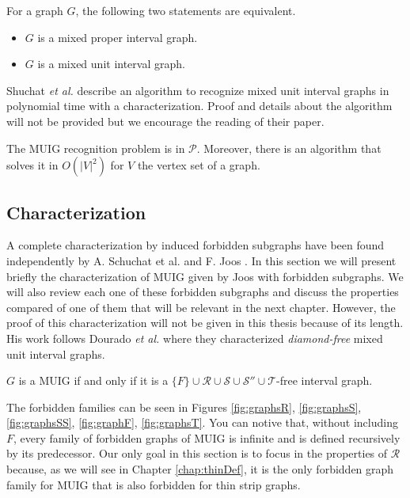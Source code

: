 \begin{theorem}
  For a graph $G$, the following two statements are equivalent.
  \begin{itemize}
    \item $G$ is a mixed proper interval graph.
    \item $G$ is a mixed unit interval graph.
  \end{itemize}
\end{theorem}

Shuchat \textit{et al.} \cite{shuchatUnitMixedInterval2014} describe an algorithm to recognize mixed unit interval graphs in polynomial time with a characterization. Proof and details about the algorithm will not be provided but we encourage the reading of their paper.

\begin{theorem}
 The MUIG recognition problem is in $\mathcal{P}$. Moreover, there is an algorithm that solves it in $O(|V|^2)$ for $V$ the vertex set of a graph.
\end{theorem}


\subsection{Characterization}
\label{sec:muig_char}

A complete characterization by induced forbidden subgraphs have been found independently by A. Schuchat et al. \cite{shuchatUnitMixedInterval2014a} and F. Joos \cite{joosCharacterizationMixedUnit2013}. In this section we will present briefly the characterization of MUIG given by Joos with forbidden subgraphs. We will also review each one of these forbidden subgraphs and discuss the properties compared of one of them that will be relevant in the next chapter. However, the proof of this characterization will not be given in this thesis because of its length. His work follows Dourado \textit{et al.} \cite{douradoMixedUnitInterval2012} where they characterized \emph{diamond-free} mixed unit interval graphs.

\begin{theorem}
  $G$ is a MUIG if and only if it is a $\{F\}\cup\mathcal{R}\cup\mathcal{S}\cup\mathcal{S''}\cup\mathcal{T}$-free interval graph.
\end{theorem}

The forbidden families can be seen in Figures \ref{fig:graphsR}, \ref{fig:graphsS}, \ref{fig:graphsSS}, \ref{fig:graphF}, \ref{fig:graphsT}. You can notive that, without including $F$, every family of forbidden graphs of MUIG is infinite and is defined recursively by its predecessor. Our only goal in this section is to focus in the properties of $\mathcal{R}$ because, as we will see in Chapter \ref{chap:thinDef}, it is the only forbidden graph family for MUIG that is also forbidden for thin strip graphs.

